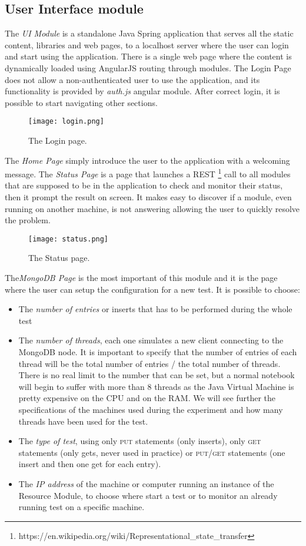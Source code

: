 \subsection{User Interface module}
The \textit{UI Module} is a standalone Java Spring application that serves all the static content, libraries and web pages, to a localhost server where the user can login and start using the application. There is a single web page where the content is dynamically loaded using AngularJS routing through modules.
The Login Page does not allow a non-authenticated user to use the application, and its functionality is provided by \textit{auth.js} angular module. After correct login, it is possible to start navigating other sections.
\begin{figure}[H]
\texttt{[image: login.png]}
\centering
\caption{The Login page.}
\end{figure}
The \textit{Home Page} simply introduce the user to the application with a welcoming message.
The \textit{Status Page} is  a page that launches a REST \footnote{https://en.wikipedia.org/wiki/Representational\_state\_transfer} call to all modules that are supposed to be in the application to check and monitor their status, then it prompt the result on screen. It makes easy to discover if a module, even running on another machine, is not answering allowing the user to quickly resolve the problem.
\begin{figure}[H]
\texttt{[image: status.png]}
\centering
\caption{The Status page.}
\end{figure}
\newpage
The\textit{MongoDB Page} is the most important of this module and  it is the page where the user can setup the configuration for a new test.
It is possible to choose:
\begin{itemize}
	\item The\textit{ number of entries} or inserts that has to be performed during the whole test
	\item The \textit{number of threads}, each one simulates a new client connecting to the MongoDB node. It is important to specify that the number of entries of each thread will be the total number of entries / the total number of threads. There is no real limit to the number that can be set, but a normal notebook will begin to suffer with more than 8 threads as the Java Virtual Machine is pretty expensive on the CPU and on the RAM. We will see further the specifications of the machines used during the experiment and how many threads have been used for the test.
	\item The \textit{type of test}, using only \textsc{put} statements (only inserts), only \textsc{get} statements (only gets, never used in practice) or \textsc{put/get} statements (one insert and then one get for each entry).
	\item The \textit{IP address} of the machine or computer running an instance of the Resource Module, to choose where start a test or to monitor an already running test on a specific machine.
\end{itemize}

